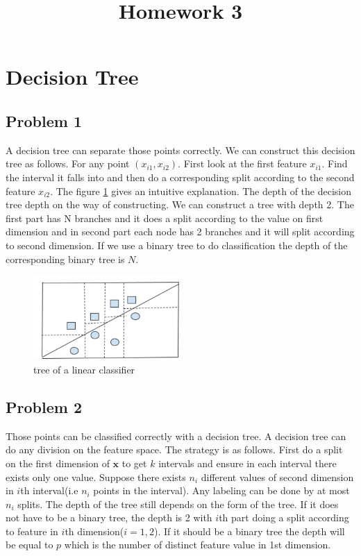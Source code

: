 \documentclass[10pt]{article}
\begin{document}
\title{Homework 3}
\date{}

\maketitle

\section{Decision Tree}

\subsection{Problem 1}

A decision tree can separate those points correctly. We can construct this decision tree as follows. For any point $(x_{i1}, x_{i2})$. First look at the first feature $x_{i1}$. Find the interval it falls into and then do a corresponding split according to the second feature $x_{i2}$. The figure \ref{fig1} gives an intuitive explanation. The depth of the decision tree depth on the way of constructing. We can construct a tree with depth 2. The first part has N branches and it does a split according to the value on first dimension and in second part each node has 2 branches and it will split according to second dimension. If we use a binary tree to do classification the depth of the corresponding binary tree is $N$. 

\begin{figure}[H]
\centering
\includegraphics[width=0.5\textwidth]{fig1.png}
\caption{\label{fig1} tree of a linear classifier}
\end{figure}

\subsection{Problem 2}

Those points can be classified correctly with a decision tree. A decision tree can do any division on the feature space. The strategy is as follows. First do a split on the first dimension of $\mathbf{x}$ to get $k$ intervals and ensure in each interval there exists only one value. Suppose there exists $n_i$ different values of second dimension in $i$th interval(i.e $n_i$ points in the interval). Any labeling can be done by at most $n_i$ splits. The depth of the tree still depends on the form of the tree. If it does not have to be a binary tree, the depth is 2 with $i$th part doing a split according to feature in $i$th dimension($i=1,2$). If it should be a binary tree the depth will be equal to $p$ which is the number of distinct feature value in 1st dimension.
\end{document}
